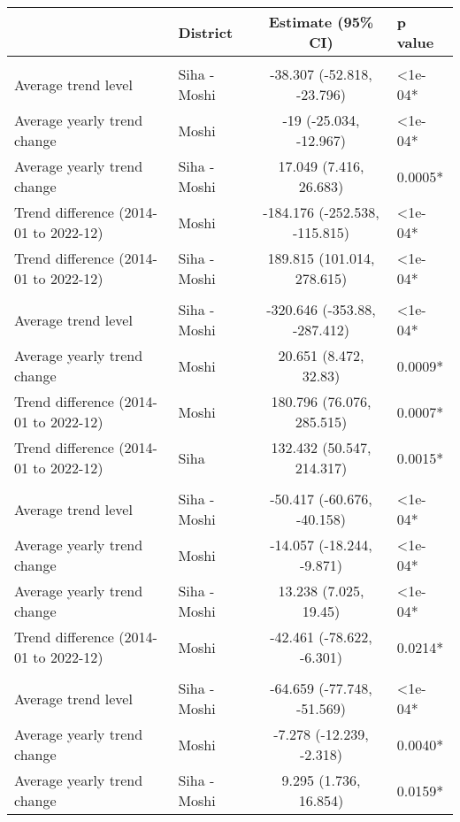 \begin{longtable}{l|lcl}
\toprule
\multicolumn{1}{l}{} & District & Estimate (95\% CI) & p value \\ 
\midrule\addlinespace[2.5pt]
\multicolumn{4}{l}{Chronic Respiratory Disease} \\ 
\midrule\addlinespace[2.5pt]
Average trend level & Siha - Moshi & -38.307 (-52.818, -23.796) & <1e-04* \\ 
Average yearly trend change & Moshi & -19 (-25.034, -12.967) & <1e-04* \\ 
Average yearly trend change & Siha - Moshi & 17.049 (7.416, 26.683) & 0.0005* \\ 
Trend difference (2014-01 to 2022-12) & Moshi & -184.176 (-252.538, -115.815) & <1e-04* \\ 
Trend difference (2014-01 to 2022-12) & Siha - Moshi & 189.815 (101.014, 278.615) & <1e-04* \\ 
\midrule\addlinespace[2.5pt]
\multicolumn{4}{l}{Diabetes Mellitus} \\ 
\midrule\addlinespace[2.5pt]
Average trend level & Siha - Moshi & -320.646 (-353.88, -287.412) & <1e-04* \\ 
Average yearly trend change & Moshi & 20.651 (8.472, 32.83) & 0.0009* \\ 
Trend difference (2014-01 to 2022-12) & Moshi & 180.796 (76.076, 285.515) & 0.0007* \\ 
Trend difference (2014-01 to 2022-12) & Siha & 132.432 (50.547, 214.317) & 0.0015* \\ 
\midrule\addlinespace[2.5pt]
\multicolumn{4}{l}{Epilepsy} \\ 
\midrule\addlinespace[2.5pt]
Average trend level & Siha - Moshi & -50.417 (-60.676, -40.158) & <1e-04* \\ 
Average yearly trend change & Moshi & -14.057 (-18.244, -9.871) & <1e-04* \\ 
Average yearly trend change & Siha - Moshi & 13.238 (7.025, 19.45) & <1e-04* \\ 
Trend difference (2014-01 to 2022-12) & Moshi & -42.461 (-78.622, -6.301) & 0.0214* \\ 
\midrule\addlinespace[2.5pt]
\multicolumn{4}{l}{Fractures} \\ 
\midrule\addlinespace[2.5pt]
Average trend level & Siha - Moshi & -64.659 (-77.748, -51.569) & <1e-04* \\ 
Average yearly trend change & Moshi & -7.278 (-12.239, -2.318) & 0.0040* \\ 
Average yearly trend change & Siha - Moshi & 9.295 (1.736, 16.854) & 0.0159* \\ 

\end{longtable}
